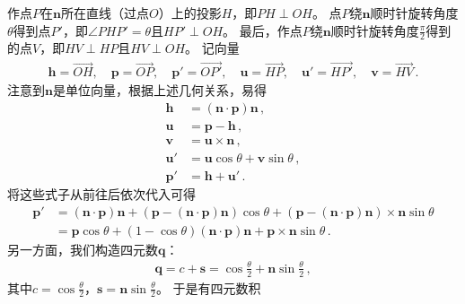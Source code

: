 作点$P$在$\bm n$所在直线（过点$O$）上的投影$H$，即$PH\perp OH$。
点$P$绕$\bm n$顺时针旋转角度$\theta$得到点$P'$，即$\angle PHP'=\theta$且$HP'\perp OH$。
最后，作点$P$绕$\bm n$顺时针旋转角度$\displaystyle\frac{\pi}{2}$得到的点$V$，即$HV\perp HP$且$HV\perp OH$。
记向量
\begin{align}
    \bm h=\overrightarrow{OH},\quad
    \bm p=\overrightarrow{OP},\quad
    \bm p'=\overrightarrow{OP'},\quad
    \bm u=\overrightarrow{HP},\quad
    \bm u'=\overrightarrow{HP'},\quad
    \bm v=\overrightarrow{HV}\, .
\end{align}
注意到$\bm n$是单位向量，根据上述几何关系，易得
\begin{align}
    \bm h  & =(\bm n\cdot\bm p)\bm n\, ,          \\
    \bm u  & =\bm p-\bm h\, ,                     \\
    \bm v  & =\bm u\times\bm n\, ,                \\
    \bm u' & =\bm u\cos\theta+\bm v\sin\theta\, , \\
    \bm p' & =\bm h+\bm u'\, .
\end{align}
将这些式子从前往后依次代入可得
\begin{align}
    \bm p' & =(\bm n\cdot\bm p)\bm n+(\bm p-(\bm n\cdot\bm p)\bm n)\cos\theta+(\bm p-(\bm n\cdot\bm p)\bm n)\times\bm n\sin\theta\nonumber \\
           & =\bm p\cos\theta+(1-\cos\theta)(\bm n\cdot\bm p)\bm n+\bm p\times\bm n\sin\theta\, .
\end{align}
另一方面，我们构造四元数$\bm q$：
\begin{align}
    \bm q=c+\bm s=\cos\frac{\theta}{2}+\bm n\sin\frac{\theta}{2}\, ,
\end{align}
其中$\displaystyle c=\cos\frac{\theta}{2}$，$\displaystyle \bm s=\bm n\sin\frac{\theta}{2}$。
于是有四元数积
